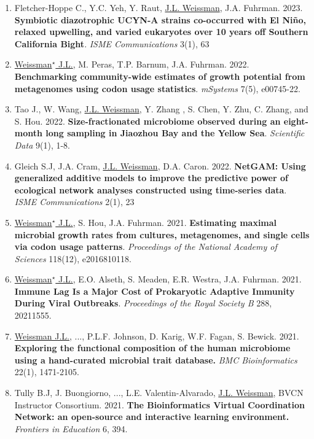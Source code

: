\documentclass[]{res}
\begin{document}
\begin{resume}
\begin{enumerate}[leftmargin=*]
\item Fletcher-Hoppe C., Y.C. Yeh, Y. Raut, \underline{J.L. Weissman}, J.A. Fuhrman. 2023. {\bf Symbiotic diazotrophic UCYN-A strains co-occurred with El Niño, relaxed upwelling, and varied eukaryotes over 10 years off Southern California Bight}. \emph{ISME Communications} 3(1), 63
 
  \item \underline{Weissman$^\star$ J.L.}, M. Peras, T.P. Barnum, J.A. Fuhrman. 2022. {\bf Benchmarking community-wide estimates of growth potential from metagenomes using codon usage statistics}. \emph{mSystems} 7(5), e00745-22.
  
    \item  Tao J., W. Wang, \underline{J.L. Weissman}, Y. Zhang , S. Chen, Y. Zhu, C. Zhang, and S. Hou. 2022. {\bf Size-fractionated microbiome observed during an eight-month long sampling in Jiaozhou Bay and the Yellow Sea}. \emph{Scientific Data} 9(1), 1-8.
 
 \item Gleich S.J, J.A. Cram, \underline{J.L. Weissman}, D.A. Caron. 2022. {\bf NetGAM: Using generalized additive models to improve the predictive power of ecological network analyses constructed using time-series data}. \emph{ISME Communications} 2(1), 23
 
\item \underline{Weissman$^\star$ J.L.}, S. Hou, J.A. Fuhrman. 2021. {\bf Estimating maximal microbial growth rates from cultures, metagenomes, and single cells via codon usage patterns}. \emph{Proceedings of the National Academy of Sciences} 118(12), e2016810118. 
 
\item \underline{Weissman$^\star$ J.L.}, E.O. Alseth, S. Meaden, E.R. Westra, J.A. Fuhrman. 2021. {\bf Immune Lag Is a Major Cost of Prokaryotic Adaptive Immunity During Viral Outbreaks}. \emph{Proceedings of the Royal Society B} 288, 20211555.

\item \underline{Weissman J.L.}, ..., P.L.F. Johnson, D. Karig, W.F. Fagan, S. Bewick. 2021. {\bf Exploring the functional composition of the human microbiome using a hand-curated microbial trait database.} \emph{BMC Bioinformatics} 22(1), 1471-2105.

\item Tully B.J, J. Buongiorno, ..., L.E. Valentin-Alvarado, \underline{J.L. Weissman}, BVCN Instructor Consortium. 2021. {\bf The Bioinformatics Virtual Coordination Network: an open-source and interactive learning environment.} \emph{Frontiers in Education} 6, 394.


\end{enumerate}
\end{resume}
\end{document}
